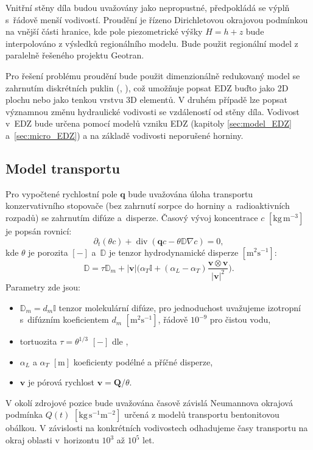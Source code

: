 \documentclass{article}
\def\abs#1{\lvert#1\rvert}
\def\prtl{\partial}
\def\unit#1{\mathrm{#1}}
\def\grad{\nabla}
\def\div{\operatorname{div}}
\def\vc#1{\mathbf{\boldsymbol{#1}}}     %
\def\tn#1{{\mathbb{#1}}}    %
\begin{document}
Vnitřní stěny díla budou uvažovány jako nepropustné, předpokládá se výplň s~řádově menší vodivostí. 
Proudění je řízeno Dirichletovou okrajovou podmínkou na vnější části hranice, kde pole piezometrické výšky $H = h + z$ 
bude interpolováno z výsledků regionálního modelu. Bude použit regionální model z paralelně řešeného projektu Geotran.

Pro řešení problému proudění bude použit dimenzionálně redukovaný model se zahrnutím diskrétních puklin (\cite{brezina_analysis_2015}, \cite{flow123d}),
což umožňuje popsat EDZ buďto jako 2D plochu nebo jako tenkou vrstvu 3D elementů.
V druhém případě lze popsat významnou změnu hydraulické vodivosti se vzdáleností od stěny díla.
Vodivost v~EDZ bude určena pomocí modelů vzniku EDZ (kapitoly \ref{sec:model_EDZ} a~\ref{sec:micro_EDZ}) 
a na základě vodivosti neporušené horniny.



\subsection{Model transportu}
\label{sec:stopovac}
Pro vypočtené rychlostní pole $\vc q$ bude uvažována úloha transportu konzervativního stopovače (bez zahrnutí sorpce do horniny a~radioaktivních rozpadů) 
se zahrnutím difúze a~disperze. Časový vývoj koncentrace $c$ $[\unit{kg\, m^{-3}}]$ je popsán rovnicí:
\[
   \prtl_t (\theta c) + \div( \vc q c - \theta \tn D \grad c) = 0,
\]
kde $\theta$ je porozita $[-]$ a~$\tn D$ je tenzor hydrodynamické disperze $[\unit{m^2s^{-1}}]$:
\[
  \tn D = \tau\tn D_m + \abs{\vc v}\Big(\alpha_T \tn I + (\alpha_L - \alpha_T)\frac{\vc v \otimes \vc v}{\abs{\vc v}^2}\Big).
\]
Parametry zde jsou:
\begin{itemize}
 \item $\tn D_m = d_m \tn I$ tenzor molekulární difúze, pro jednoduchost uvažujeme izotropní s~difúzním koeficientem $d_m$ $[\unit{m^2s^{-1}}]$, řádově $10^{-9}$ pro čistou vodu,
 \item tortuozita $\tau=\theta^{1/3}$ $[-]$ dle \cite{millington_quirk},
 \item $\alpha_L$ a $\alpha_T$ $[\unit{m}]$ koeficienty podélné a příčné disperze,
 \item $\vc v$ je pórová rychlost $\vc v = \vc Q / \theta$.
\end{itemize}

V okolí zdrojové pozice bude uvažována časově závislá Neumannova okrajová podmínka $Q(t)$ $[\unit{kg\, s^{-1}m^{-2}}]$
určená z modelů transportu bentonitovou obálkou. V závislosti na konkrétních vodivostech odhadujeme časy 
transportu na okraj oblasti v~horizontu $10^3$ až $10^5$ let. 
\end{document}
